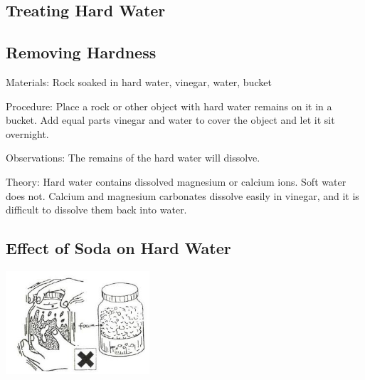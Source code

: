\begin{multicols}{2}
\vfill
\columnbreak


\section*{Treating Hard Water}


\subsection{Removing Hardness}


\begin{description*}
\item[Materials:]{Rock soaked in hard water, vinegar, water, bucket}
\item[Procedure:]{Place a rock or other object with hard water remains on it in a bucket. Add equal parts vinegar and water to cover the object and let it sit overnight.}
\item[Observations:]{The remains of the hard water will dissolve.}
\item[Theory:]{Hard water contains dissolved magnesium or calcium ions.
Soft water does not. Calcium and magnesium carbonates dissolve easily in vinegar, and it is difficult to dissolve them back into water.}
\end{description*}

\vfill
\columnbreak

\subsection{Effect of Soda on Hard Water}

\begin{center}
\includegraphics[width=0.4\textwidth]{./img/source/soda-hard-water.jpg}
\end{center}


\end{multicols}
